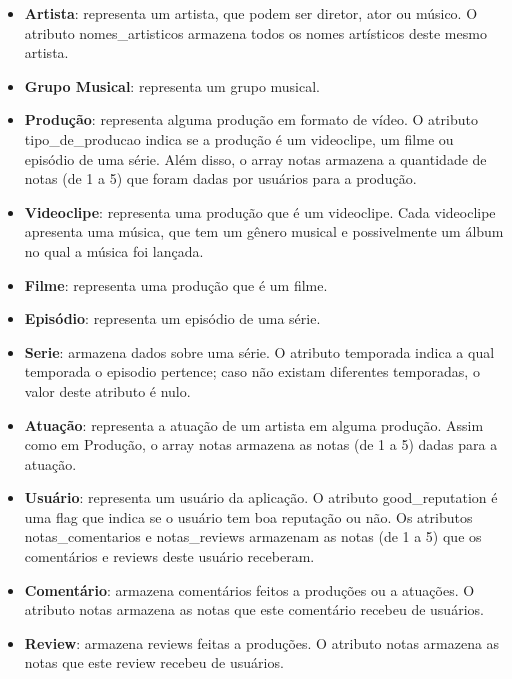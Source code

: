 \documentclass[12pt]{article}
\begin{document}
\begin{itemize}
    \item{\bf Artista}: representa um artista, que podem ser diretor,
        ator ou músico. O atributo {\ttfamily nomes\_artisticos} 
        armazena todos os nomes artísticos deste mesmo artista.
    \item{\bf Grupo Musical}: representa um grupo musical.
    \item{\bf Produção}: representa alguma produção em formato de vídeo.
        O atributo {\ttfamily tipo\_de\_producao} indica se a produção é
        um videoclipe, um filme ou episódio de uma série. Além disso, o
        array {\ttfamily notas} armazena a quantidade de notas 
        (de 1 a 5) que foram dadas por usuários para a produção.
    \item{\bf Videoclipe}: representa uma produção que é um videoclipe. 
        Cada videoclipe apresenta uma música, que tem um gênero musical 
        e possivelmente um álbum no qual a música foi lançada.
    \item{\bf Filme}: representa uma produção que é um filme.
    \item{\bf Episódio}: representa um episódio de uma série.
    \item{\bf Serie}: armazena dados sobre uma série. O atributo 
        {\ttfamily temporada} indica a qual temporada o episodio 
        pertence; caso não existam diferentes temporadas, o valor deste
        atributo é nulo.
    \item{\bf Atuação}: representa a atuação de um artista em alguma 
        produção. Assim como em Produção, o array {\ttfamily notas} 
        armazena as notas (de 1 a 5) dadas para a atuação.
    \item{\bf Usuário}: representa um usuário da aplicação. O atributo
        {\ttfamily good\_reputation} é uma flag que indica se o usuário
        tem boa reputação ou não. Os atributos 
        {\ttfamily notas\_comentarios} e {\ttfamily notas\_reviews}
        armazenam as notas (de 1 a 5) que os comentários e reviews deste 
        usuário receberam.
    \item{\bf Comentário}: armazena comentários feitos a produções
        ou a atuações. O atributo {\ttfamily notas} armazena as notas
        que este comentário recebeu de usuários.
    \item{\bf Review}: armazena reviews feitas a produções. O atributo
        {\ttfamily notas} armazena as notas que este review recebeu de
        usuários.
\end{itemize}
\end{document}
